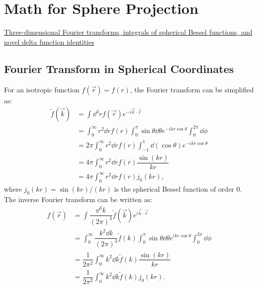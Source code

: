 \chapter{Math for Sphere Projection}

\begin{introduction}
    \item \href{https://arxiv.org/pdf/1302.1830}{Three-dimensional Fourier transforms, integrals of spherical Bessel functions, and novel delta function identities}
\end{introduction}

\section{Fourier Transform in Spherical Coordinates}

For an isotropic function $f(\vec{r}) = f(r)$, the Fourier transform can be simplified as:
\begin{align*}
    \tilde{f}(\vec{k}) & = \int \dd^3 r f(\vec{r}) e^{-i\vec{k}\cdot \vec{r}} \\
    & = \int_0^\infty r^2 \dd r f(r) \int_0^\pi \sin\theta \dd \theta e^{-ikr\cos\theta} \int_0^{2\pi} \dd \phi \\
    & = 2\pi \int_0^\infty r^2 \dd r f(r) \int_{-1}^{1} \dd (\cos\theta) e^{-ikr\cos\theta} \\
    & = 4\pi \int_0^\infty r^2 \dd r f(r) \dfrac{\sin(kr)}{kr} \\
    & = 4\pi \int_0^\infty r^2 \dd r f(r) j_0(kr),
\end{align*}
where $j_0(kr) = \sin(kr)/(kr)$ is the spherical Bessel function of order 0. The inverse Fourier transform can be written as:
\begin{align*}
    f(\vec{r}) & = \int \dfrac{\dd^3 k}{(2\pi)^3} \tilde{f}(\vec{k}) e^{i\vec{k}\cdot \vec{r}} \\
    & = \int_0^\infty \dfrac{k^2 \dd k}{(2\pi)^3} \tilde{f}(k) \int_0^\pi \sin\theta \dd \theta e^{ikr\cos\theta} \int_0^{2\pi} \dd \phi \\
    & = \dfrac{1}{2\pi^2} \int_0^\infty k^2 \dd k \tilde{f}(k) \dfrac{\sin(kr)}{kr} \\
    & = \dfrac{1}{2\pi^2} \int_0^\infty k^2 \dd k \tilde{f}(k) j_0(kr).
\end{align*}
